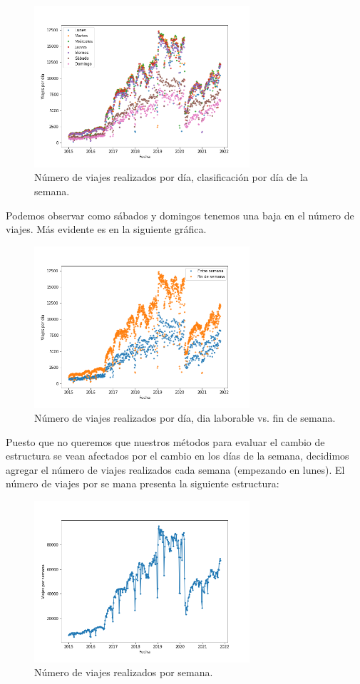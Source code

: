 \documentclass[
]{article}
\begin{document}
\begin{figure}[!h]
\centering
\includegraphics[width=8cm, height=6cm]{../plots/trips_daily_by_day.png}
\caption{Número de viajes realizados por día, clasificación por día de la semana.}
\end{figure}

Podemos observar como sábados y domingos tenemos una baja en el número
de viajes. Más evidente es en la siguiente gráfica.

\begin{figure}[!h]
\centering
\includegraphics[width=8cm, height=6cm]{../plots/trips_daily_by_weekend.png}
\caption{Número de viajes realizados por día, dia laborable vs. fin de semana.}
\end{figure}

Puesto que no queremos que nuestros métodos para evaluar el cambio de
estructura se vean afectados por el cambio en los días de la semana,
decidimos agregar el número de viajes realizados cada semana (empezando
en lunes). El número de viajes por se mana presenta la siguiente
estructura:

\begin{figure}[!h]
\centering
\includegraphics[width=8cm, height=6cm]{../plots/trips_weekly.png}
\caption{Número de viajes realizados por semana.}
\end{figure}
\end{document}
